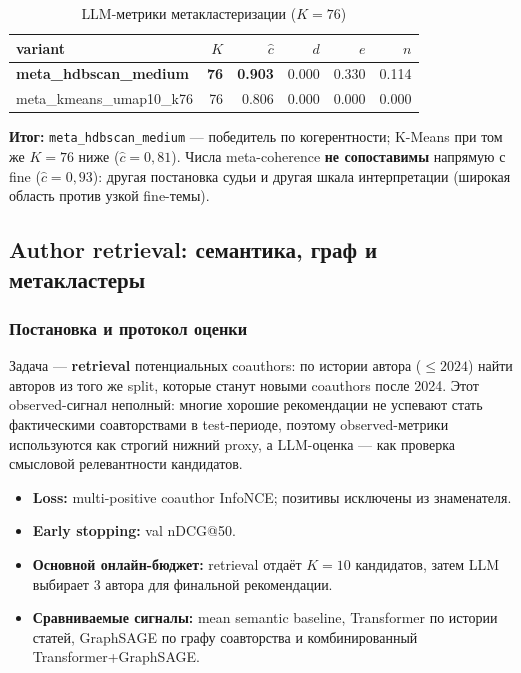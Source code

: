 \begin{table}[ht]
\caption{LLM-метрики метакластеризации ($K = 76$)}
\label{tab:meta-cluster}
\centering
\footnotesize
\begin{tabular}{lrrrrr}
\toprule
variant & $K$ & $\hat{c}$ & $d$ & $e$ & $n$ \\
\midrule
\textbf{meta\_hdbscan\_medium} & \textbf{76} & \textbf{0.903} & 0.000 & 0.330 & 0.114 \\
meta\_kmeans\_umap10\_k76      & 76 & 0.806 & 0.000 & 0.000 & 0.000 \\
\bottomrule
\end{tabular}
\end{table}

\textbf{Итог:} \texttt{meta\_hdbscan\_medium} — победитель по когерентности; K-Means при том же
$K = 76$ ниже ($\hat{c} = 0{,}81$). Числа meta-coherence \textbf{не сопоставимы} напрямую с
fine ($\hat{c} = 0{,}93$): другая постановка судьи и другая шкала интерпретации (широкая область
против узкой fine-темы).

\subsection{Author retrieval: семантика, граф и метакластеры}
\label{sec:exp-retrieval}

\subsubsection{Постановка и протокол оценки}

Задача — \textbf{retrieval} потенциальных coauthors: по истории автора ($\leq 2024$) найти авторов
из того же split, которые станут новыми coauthors после 2024. Этот observed-сигнал неполный:
многие хорошие рекомендации не успевают стать фактическими соавторствами в test-периоде, поэтому
observed-метрики используются как строгий нижний proxy, а LLM-оценка — как проверка смысловой
релевантности кандидатов.

\begin{itemize}
  \item \textbf{Loss:} multi-positive coauthor InfoNCE; позитивы исключены из знаменателя.
  \item \textbf{Early stopping:} val nDCG@50.
  \item \textbf{Основной онлайн-бюджет:} retrieval отдаёт $K = 10$ кандидатов, затем LLM выбирает
        3 автора для финальной рекомендации.
  \item \textbf{Сравниваемые сигналы:} mean semantic baseline, Transformer по истории статей,
        GraphSAGE по графу соавторства и комбинированный Transformer+GraphSAGE.
\end{itemize}

